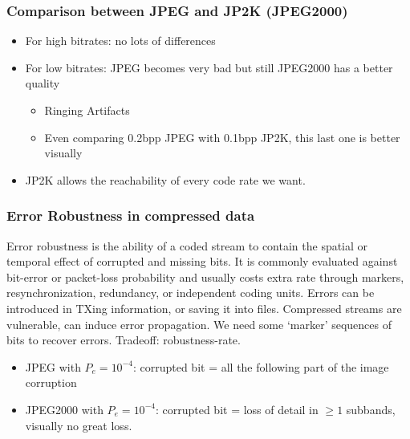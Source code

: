 \subsubsection{Comparison between JPEG and JP2K (JPEG2000)}
\begin{itemize}
    \item For high bitrates: no lots of differences
    \item For low bitrates: JPEG becomes very bad but still JPEG2000 has a better quality
    \begin{itemize}
        \item Ringing Artifacts
        \item Even comparing 0.2bpp JPEG with 0.1bpp JP2K, this last one is better visually
    \end{itemize}
    \item JP2K allows the reachability of every code rate we want.
\end{itemize}
\subsubsection{Error Robustness in compressed data}
Error robustness is the ability of a coded stream to contain the spatial or temporal effect of corrupted and missing bits. It is commonly evaluated against bit-error or packet-loss probability and usually costs extra rate through markers, resynchronization, redundancy, or independent coding units.
Errors can be introduced in TXing information, or saving it into files.
Compressed streams are vulnerable, can induce error propagation. We need some `marker' sequences of bits to recover errors.
Tradeoff: robustness-rate.
\begin{itemize}
    \item JPEG with $P_e=10^{-4}$: corrupted bit = all the following part of the image corruption
    \item JPEG2000 with $P_e=10^{-4}$: corrupted bit = loss of detail in $\geq 1$ subbands, visually no great loss.
\end{itemize} 
